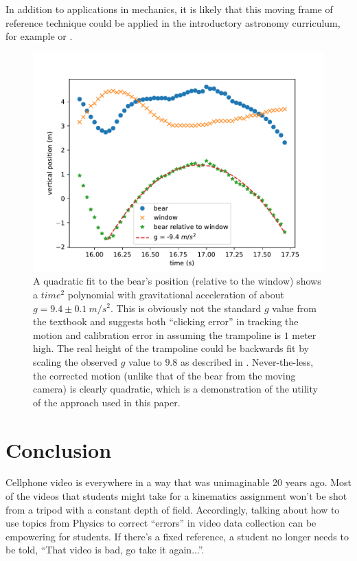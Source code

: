 \documentclass[12pt]{iopart}
\begin{document}
 In addition to applications in mechanics, it is likely that this moving frame of reference technique could be applied in the introductory astronomy curriculum, for example \cite{tracker_planets} or \cite{retrograde_planets}.
     
\begin{figure}[h]
\centering
\includegraphics[width=\columnwidth]{figure_8_bear-quadratic.pdf}
\caption{
A quadratic fit to the bear's position (relative to the window) shows a $time^2$ polynomial with gravitational acceleration of about $g=9.4\pm 0.1~m/s^2$.  This is obviously not the standard $g$ value from the textbook and suggests both ``clicking error'' in tracking the motion and calibration error in assuming the trampoline is $1$ meter high. The real height of the trampoline could be backwards fit by scaling the observed $g$ value to $9.8$ as described in \cite{backwards_fit}. 
Never-the-less, the corrected motion (unlike that of the bear from the moving camera) is clearly quadratic, which is a demonstration of the utility of the approach used in this paper.
}
\label{bear-quadratic}
\end{figure}

\section{Conclusion}
Cellphone video is everywhere in a way that was unimaginable 20 years ago.  Most of the videos that students might take for a kinematics assignment won't be shot from a tripod with a constant depth of field.  Accordingly, talking about how to use topics from Physics to correct ``errors'' in video data collection can be empowering for students.  If there's a fixed reference, a student no longer needs to be told, ``That video is bad, go take it again...''.
\end{document}
